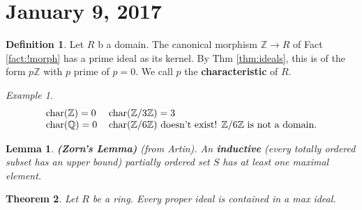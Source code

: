\documentclass{amsart}
\newcommand{\QQ}{\mathbb{Q}}
\newcommand{\ZZ}{\mathbb{Z}}
\newcommand{\Zn}[1]{\mathbb{Z} / #1 \mathbb{Z}}
\newtheorem{thm}{Theorem}[section]
\newtheorem*{unnumlemma}{Lemma}
\theoremstyle{definition}
\newtheorem{defn}[thm]{Definition}
\theoremstyle{remark}
\newtheorem*{ex}{Example}
\begin{document}
\section{January 9, 2017}
\begin{defn}
    Let $R$ b a domain. The canonical morphism $\ZZ \rightarrow R$ of Fact \ref{fact:!morph} has
    a prime ideal as its kernel. By Thm \ref{thm:ideals}, this is of the form
    $p\ZZ$ with $p$ prime of $p = 0$. We call $p$ the \textbf{characteristic} of $R$.
\end{defn}
\begin{ex}
\[
\begin{tabular}{ll}
    char$(\ZZ) = 0$ & char$(\Zn 3) = 3$ \\
    char$(\QQ) = 0$ & char$(\Zn 6)$ doesn't exist! $\Zn 6 $ is not a domain.
\end{tabular}
\]
\end{ex}
\begin{unnumlemma}
\textbf{(Zorn's Lemma)} (from Artin). An \textbf{inductive} (every totally ordered
subset has an upper bound) partially ordered set $S$ has at least one maximal element.
\end{unnumlemma}
\begin{thm}
    Let $R$ be a ring. Every proper ideal is contained in a max ideal.
\end{thm}
\end{document}
